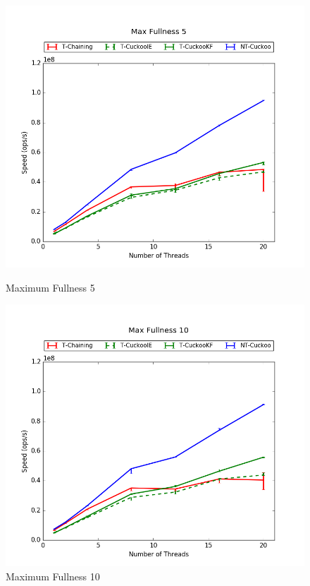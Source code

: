 \begin{figure}[H]
    \centering
	\begin{minipage}{0.45\textwidth}\includegraphics[width=\textwidth]{maps/5HM125K:F90,I5,E5.png} 
        \caption*{Maximum Fullness 5}
    \end{minipage}
	\begin{minipage}{0.45\textwidth}\includegraphics[width=\textwidth]{maps/10HM125K:F90,I5,E5.png} 
        \caption*{Maximum Fullness 10}

\end{minipage}
\end{figure}
